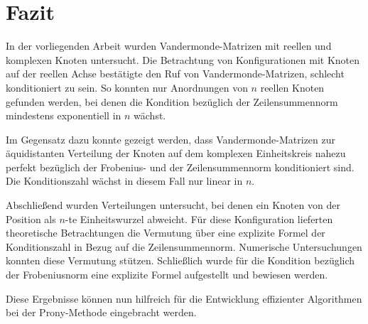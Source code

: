 \chapter{Fazit}

In der vorliegenden Arbeit wurden Vandermonde-Matrizen mit reellen und
komplexen Knoten untersucht.
Die Betrachtung von Konfigurationen mit Knoten auf der reellen Achse
bestätigte den Ruf von Vandermonde-Matrizen, schlecht konditioniert zu sein.
So konnten nur Anordnungen von $n$ reellen Knoten gefunden werden, bei denen die Kondition
bezüglich der Zeilensummennorm mindestens exponentiell in $n$ wächst.

Im Gegensatz dazu konnte gezeigt werden, dass Vandermonde-Matrizen zur
äquidistanten Verteilung der Knoten auf dem komplexen Einheitskreis nahezu
perfekt bezüglich der Frobenius- und der Zeilensummennorm konditioniert sind.
Die Konditionszahl wächst in diesem Fall nur linear in $n$.

Abschließend wurden Verteilungen untersucht, bei denen ein Knoten von der
Position als $n$-te Einheitswurzel abweicht.  Für diese Konfiguration
lieferten theoretische Betrachtungen die Vermutung über eine explizite Formel
der Konditionszahl in Bezug auf die Zeilensummennorm.  Numerische
Untersuchungen konnten diese Vermutung stützen.  Schließlich wurde für die
Kondition bezüglich der Frobeniusnorm eine explizite Formel aufgestellt und
bewiesen werden.

Diese Ergebnisse können nun hilfreich für die Entwicklung effizienter
Algorithmen bei der Prony-Methode eingebracht werden.
